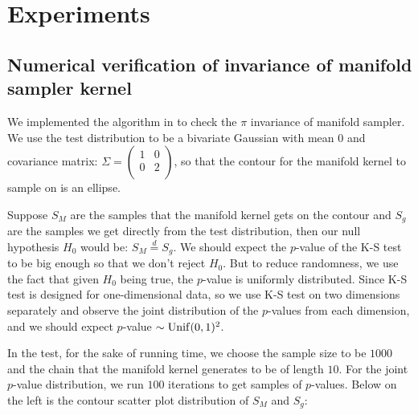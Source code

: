 \documentclass{article}
\begin{document}
\section{Experiments}
\subsection{Numerical verification of invariance of manifold sampler kernel}
We implemented the algorithm in \cite{ratest} to check the $\pi$ invariance of manifold sampler. We use the test distribution to be a bivariate Gaussian with mean $0$ and covariance matrix: $\Sigma = \begin{pmatrix}
1 & 0\\
0 & 2\\
\end{pmatrix}$, so that the contour for the manifold kernel to sample on is an ellipse. 

Suppose $S_M$ are the samples that the manifold kernel gets on the contour and $S_g$ are the samples we get directly from the test distribution, then our null hypothesis $H_0$ would be: $S_M \overset{d}{=} S_g$. We should expect the $p$-value of the K-S test to be big enough so that we don't reject $H_0$. But to reduce randomness, we use the fact that given $H_0$ being true, the $p$-value is uniformly distributed. Since K-S test is designed for one-dimensional data, so we use K-S test on two dimensions separately and observe the joint distribution of the $p$-values from each dimension, and we should expect $p$-value $\sim \operatorname{Unif}(0,1)^2$.

In the test, for the sake of running time, we choose the sample size to be $1000$ and the chain that the manifold kernel generates to be of length $10$. For the joint $p$-value distribution, we run $100$ iterations to get samples of $p$-values. Below on the left is the contour scatter plot distribution of $S_M$ and $S_g$:


    
\end{document}
